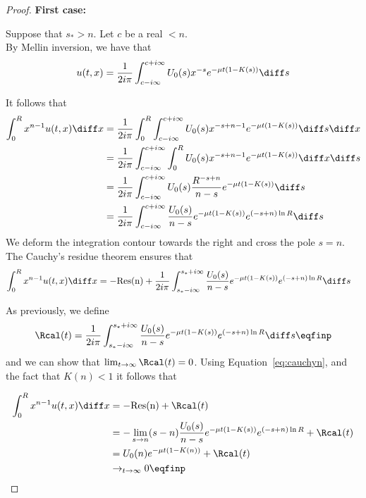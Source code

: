 \begin{proof}
\textbf{First case:}

Suppose that $s_* > n$. Let $c$ be a real $<n$. \\
    By Mellin inversion, we have that
    \begin{align*}
        u(t,x) = \frac{1}{2i\pi}\int_{c-i\infty}^{c+i\infty} U_0(s) x^{-s} e^{-\mu t(1 - K(s))} \diff s
    \end{align*}

It follows that
\begin{align*}
    \int_0^R x^{n-1}u(t,x) \diff x 
    &= \frac{1}{2i\pi} \int_0^R \int_{c-i\infty}^{c+i\infty} U_0(s) x^{-s+n-1} e^{-\mu t(1 - K(s))} \diff s \diff x \\
    &= \frac{1}{2i\pi} \int_{c-i\infty}^{c+i\infty} \int_0^R U_0(s) x^{-s+n-1} e^{-\mu t(1 - K(s))} \diff x \diff s \\
    &= \frac{1}{2i\pi} \int_{c-i\infty}^{c+i\infty} U_0(s) \frac{R^{-s+n}}{n-s} e^{-\mu t(1 - K(s))} \diff s \\
    &= \frac{1}{2i\pi} \int_{c-i\infty}^{c+i\infty} \frac{U_0(s)}{n-s} e^{-\mu t(1 - K(s))} e^{(-s+n)\ln R} \diff s
\end{align*}
We deform the integration contour towards the right and cross the pole $s = n$. The Cauchy's residue theorem ensures that
\begin{align}
    \int_0^R x^{n-1}u(t,x) \diff x &= -\mathrm{Res(n)} + \frac{1}{2i\pi} \int_{s_*-i\infty}^{s_*+i\infty} \frac{U_0(s)}{n-s} e^{-\mu t(1 - K(s))} e^{(-s+n)\ln R} \diff s 
    \label{eq:cauchyn}
\end{align}


As previously, we define
\begin{align*}
    \Rcal(t) = \frac{1}{2i\pi} \int_{s_*-i\infty}^{s_*+i\infty} \frac{U_0(s)}{n-s} e^{-\mu t(1 - K(s))} e^{(-s+n)\ln R} \diff s
    \eqfinp
\end{align*}
and we can show that $\lim_{t\to\infty}\Rcal(t) = 0$. Using Equation~\ref{eq:cauchyn}, and the fact that $K(n) < 1$ it follows that 


\begin{align*}
    \int_0^R x^{n-1}u(t,x) \diff x &= -\mathrm{Res(n)} + \Rcal(t) \\
    &= -\lim_{s \to n} (s-n)\frac{U_0(s)}{n-s} e^{-\mu t(1 - K(s))} e^{(-s+n)\ln R}  + \Rcal(t)\\
    &= U_0(n)e^{-\mu t(1 - K(n))} + \Rcal(t)\\
    &\to_{t \to \infty} 0
    \eqfinp
\end{align*}


\end{proof}
